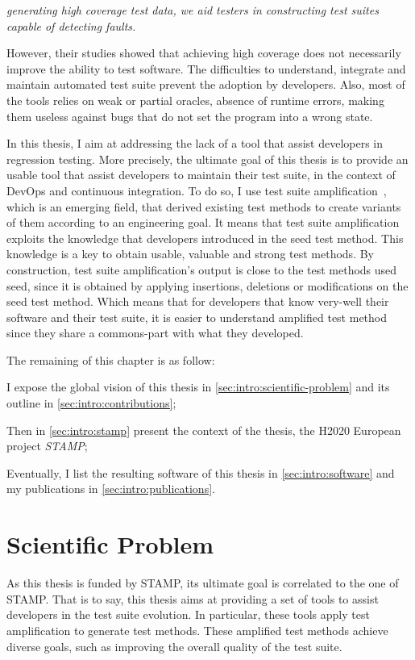 \emph{generating high coverage test data, we aid testers in constructing test suites capable of detecting faults.}

However, their studies showed that achieving high coverage does not necessarily improve the ability to test software.
The difficulties to understand, integrate and maintain automated test suite prevent the adoption by developers.
Also, most of the tools relies on weak or partial oracles, \eg absence of runtime errors, making them useless against bugs that do not set the program into a wrong state.

In this thesis, I aim at addressing the lack of a tool that assist developers in regression testing.
More precisely, the ultimate goal of this thesis is to provide an usable tool that assist developers to maintain their test suite, in the context of DevOps and continuous integration.
To do so, I use test suite amplification~\cite{yoo2012,DANGLOT2019110398}, which is an emerging field, that derived existing test methods to create variants of them according to an engineering goal.
It means that test suite amplification exploits the knowledge that developers introduced in the seed test method.
This knowledge is a key to obtain usable, valuable and strong test methods.
By construction, test suite amplification's output is close to the test methods used seed, since it is obtained by applying insertions, deletions or modifications on the seed test method.
Which means that for developers that know very-well their software and their test suite, it is easier to understand amplified test method since they share a commons-part with what they developed.

The remaining of this chapter is as follow:

I expose the global vision  of this thesis in \autoref{sec:intro:scientific-problem} and its outline in \autoref{sec:intro:contributions};

Then in \autoref{sec:intro:stamp} present the context of the thesis, the H2020 European project \emph{STAMP};

Eventually, I list the resulting software of this thesis in \autoref{sec:intro:software} and my publications in \autoref{sec:intro:publications}.

\section{Scientific Problem}
\label{sec:intro:scientific-problem}

As this thesis is funded by STAMP, its ultimate goal is correlated to the one of STAMP.
That is to say, this thesis aims at providing a set of tools to assist developers in the test suite evolution.
In particular,  these tools apply test amplification to generate test methods.
These amplified test methods achieve diverse goals, such as improving the overall quality of the test suite.

